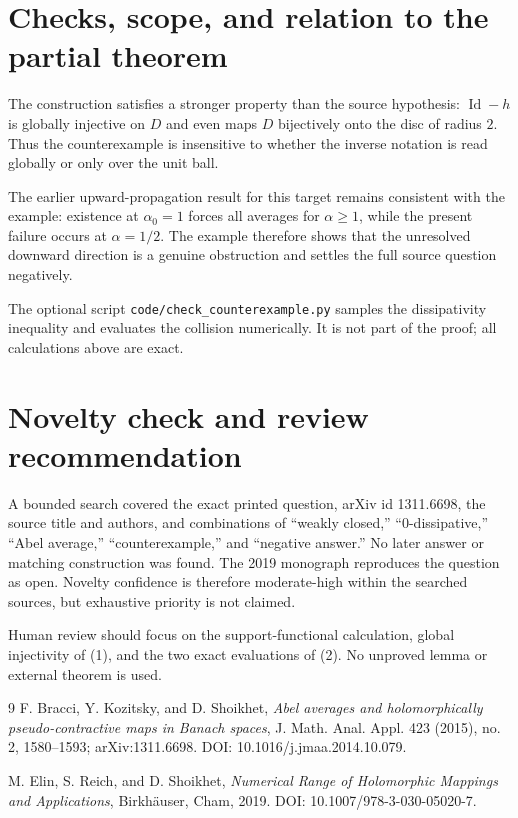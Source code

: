 \documentclass[11pt]{article}
\newcommand{\Id}{\operatorname{Id}}
\begin{document}
\section{Checks, scope, and relation to the partial theorem}

The construction satisfies a stronger property than the source hypothesis:
$\Id-h$ is globally injective on $D$ and even maps $D$ bijectively onto the
disc of radius $2$.  Thus the counterexample is insensitive to whether the
inverse notation is read globally or only over the unit ball.

The earlier upward-propagation result for this target remains consistent with
the example: existence at $\alpha_0=1$ forces all averages for
$\alpha\ge1$, while the present failure occurs at $\alpha=1/2$.  The example
therefore shows that the unresolved downward direction is a genuine
obstruction and settles the full source question negatively.

The optional script \texttt{code/check\_counterexample.py} samples the
dissipativity inequality and evaluates the collision numerically.  It is not
part of the proof; all calculations above are exact.

\section{Novelty check and review recommendation}

A bounded search covered the exact printed question, arXiv id 1311.6698, the
source title and authors, and combinations of ``weakly closed,''
``0-dissipative,'' ``Abel average,'' ``counterexample,'' and ``negative
answer.''  No later answer or matching construction was found.  The 2019
monograph \cite{ERS} reproduces the question as open.  Novelty confidence is
therefore moderate-high within the searched sources, but exhaustive priority
is not claimed.

Human review should focus on the support-functional calculation, global
injectivity of (1), and the two exact evaluations of (2).  No unproved lemma
or external theorem is used.

\begin{thebibliography}{9}
F. Bracci, Y. Kozitsky, and D. Shoikhet,
\emph{Abel averages and holomorphically pseudo-contractive maps in Banach
spaces}, J. Math. Anal. Appl. 423 (2015), no. 2, 1580--1593;
arXiv:1311.6698. DOI: 10.1016/j.jmaa.2014.10.079.

M. Elin, S. Reich, and D. Shoikhet,
\emph{Numerical Range of Holomorphic Mappings and Applications},
Birkh\"auser, Cham, 2019. DOI: 10.1007/978-3-030-05020-7.
\end{thebibliography}
\end{document}

